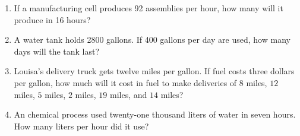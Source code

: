 \documentclass[12pt]{article}
\begin{document}
\begin{enumerate}
\item If a manufacturing cell produces 92 assemblies per hour, how many will it produce in 16 hours? 
  \vspace{0.5in}
  \vspace{0.5in}

\item A water tank holds 2800 gallons. If 400 gallons per day are used, how many days will the tank last? 
  \vspace{0.5in}
  \vspace{0.5in}

\item Louisa's delivery truck gets twelve miles per gallon. If fuel costs three dollars per gallon, how much will it cost in fuel to make deliveries of $8$ miles, $12$ miles, $5$ miles, $2$ miles, $19$ miles, and $14$ miles? 
  \vspace{0.5in}
  \vspace{0.5in}
  \vspace{0.5in}

\item An chemical process used twenty-one thousand liters of water in seven hours. How many liters per hour did it use? 
  \vspace{0.5in}
  \vspace{0.5in}
  \vspace{0.5in}

\end{enumerate}
\end{document}
